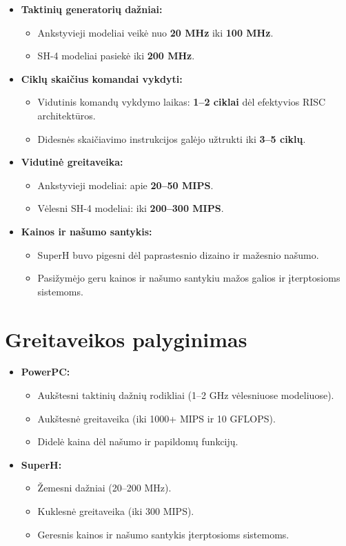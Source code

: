 \documentclass{article}
\begin{document}
\begin{itemize}
    \item \textbf{Taktinių generatorių dažniai:}
        \begin{itemize}
            \item Ankstyvieji modeliai veikė nuo \textbf{20 MHz} iki \textbf{100 MHz}.
            \item SH-4 modeliai pasiekė iki \textbf{200 MHz}.
        \end{itemize}
    \item \textbf{Ciklų skaičius komandai vykdyti:}
        \begin{itemize}
            \item Vidutinis komandų vykdymo laikas: \textbf{1–2 ciklai} dėl efektyvios RISC architektūros.
            \item Didesnės skaičiavimo instrukcijos galėjo užtrukti iki \textbf{3–5 ciklų}.
        \end{itemize}
    \item \textbf{Vidutinė greitaveika:}
        \begin{itemize}
            \item Ankstyvieji modeliai: apie \textbf{20–50 MIPS}.
            \item Vėlesni SH-4 modeliai: iki \textbf{200–300 MIPS}.
        \end{itemize}
    \item \textbf{Kainos ir našumo santykis:}
        \begin{itemize}
            \item SuperH buvo pigesni dėl paprastesnio dizaino ir mažesnio našumo.
            \item Pasižymėjo geru kainos ir našumo santykiu mažos galios ir įterptosioms sistemoms.
        \end{itemize}
\end{itemize}

\section*{Greitaveikos palyginimas}
\begin{itemize}
    \item \textbf{PowerPC:}
        \begin{itemize}
            \item Aukštesni taktinių dažnių rodikliai (1–2 GHz vėlesniuose modeliuose).
            \item Aukštesnė greitaveika (iki 1000+ MIPS ir 10 GFLOPS).
            \item Didelė kaina dėl našumo ir papildomų funkcijų.
        \end{itemize}
    \item \textbf{SuperH:}
        \begin{itemize}
            \item Žemesni dažniai (20–200 MHz).
            \item Kuklesnė greitaveika (iki 300 MIPS).
            \item Geresnis kainos ir našumo santykis įterptosioms sistemoms.
        \end{itemize}
\end{itemize}
\end{document}
